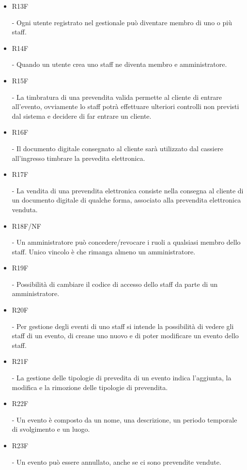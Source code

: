 \documentclass[a4paper]{article}
\begin{document}
\begin{itemize}
	
	\item \hypertarget{R13F}{R13F} - Ogni utente registrato nel gestionale può diventare membro di uno o più staff. 
	
	\item \hypertarget{R14F}{R14F} - Quando un utente crea uno staff ne diventa membro e amministratore.
	
	\item \hypertarget{R15F}{R15F} - La timbratura di una prevendita valida permette al cliente di entrare all'evento, ovviamente lo staff potrà effettuare ulteriori controlli non previsti dal sistema e decidere di far entrare un cliente.
	
	\item \hypertarget{R16F}{R16F} - Il documento digitale consegnato al cliente sarà utilizzato dal cassiere all'ingresso timbrare la prevedita elettronica.
	
	
	\item \hypertarget{R17F}{R17F} - La vendita di una prevendita elettronica consiste nella consegna al cliente di un documento digitale di qualche forma, associato alla prevendita elettronica venduta.

	
	\item \hypertarget{R18F/NF}{R18F/NF} - Un amministratore può concedere/revocare i ruoli a qualsiasi membro dello staff. Unico vincolo è che rimanga almeno un amministratore.
	\item \hypertarget{R19F}{R19F} - Possibilità di cambiare il codice di accesso dello staff da parte di un amministratore.
	   
	\item \hypertarget{R20F}{R20F} - Per gestione degli eventi di uno staff si intende la possibilità di vedere gli staff di un evento, di creane uno nuovo e di poter modificare un evento dello staff.
		
	\item \hypertarget{R21F}{R21F} - La gestione delle tipologie di prevedita di un evento indica l'aggiunta, la modifica e la rimozione delle tipologie di prevendita.
	
	\item \hypertarget{R22F}{R22F} - Un evento è composto da un nome, una descrizione, un periodo temporale di svolgimento e un luogo. 
	\item \hypertarget{R23F}{R23F} - Un evento può essere annullato, anche se ci sono prevendite vendute.
	

\end{itemize}
\end{document}
